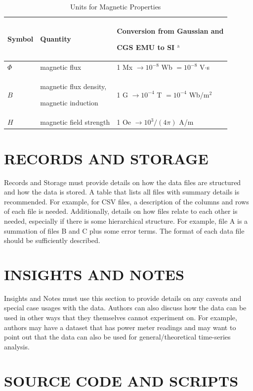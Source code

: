 \documentclass{IEEEoj-data}
\begin{document}
\begin{table}
\caption{Units for Magnetic Properties}
\label{table}
\setlength{\tabcolsep}{3pt}
\begin{tabular}{|p{25pt}|p{75pt}|p{115pt}|}
\hline
Symbol& 
Quantity& 
Conversion from Gaussian and \par CGS EMU to SI $^{\mathrm{a}}$ \\
\hline
$\Phi $& 
magnetic flux& 
1 Mx $\to  10^{-8}$ Wb $= 10^{-8}$ V$\cdot $s \\
$B$& 
magnetic flux density, \par magnetic induction& 
1 G $\to  10^{-4}$ T $= 10^{-4}$ Wb/m$^{2}$ \\
$H$& 
magnetic field strength& 
1 Oe $\to  10^{3}/(4\pi )$ A/m \\
\hline
\end{tabular}
\label{tab1}
\end{table}

\section*{RECORDS AND STORAGE} 

Records and Storage must provide details on how the data files are structured and how the data is stored. A table that lists all files with summary details is recommended. For example, for CSV files, a description of the columns and rows of each file is needed. Additionally, details on how files relate to each other is needed, especially if there is some hierarchical structure. For example, file A is a summation of files B and C plus some error terms. The format of each data file should be sufficiently described.
\balance
\section*{INSIGHTS AND NOTES} 

Insights and Notes must use this section to provide details on any caveats and special case usages with the data. Authors can also discuss how the data can be used in other ways that they themselves cannot experiment on.  For example, authors may have a dataset that has power meter readings and may want to point out that the data can also be used for general/theoretical time-series analysis.

\section*{SOURCE CODE AND SCRIPTS} 
\end{document}

